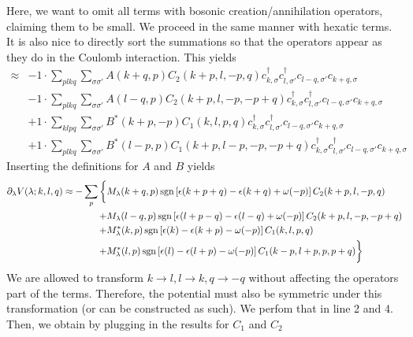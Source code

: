 Here, we want to omit all terms with bosonic creation/annihilation operators, claiming them to be small. We proceed in the same manner with hexatic terms.
It is also nice to directly sort the summations so that the operators appear as they do in the Coulomb interaction. This yields
\begin{align*}
	[\eta, H'] \approx 	&-1 \cdot \sum_{ p l k q } \sum_{ \sigma \sigma' } A( k+q, p )  C_2( k+p, l, -p, q )   c_{ k, \sigma }^\dagger  c_{ l, \sigma' }^\dagger  c_{ l-q, \sigma' } c_{ k+q, \sigma }  \\
	&-1 \cdot \sum_{ p l k q } \sum_{ \sigma \sigma' } A( l-q, p )  C_2( k+p, l, -p, -p+q )   c_{ k, \sigma }^\dagger  c_{ l, \sigma' }^\dagger  c_{ l-q, \sigma' } c_{ k+q, \sigma }  \\
	&+1 \cdot \sum_{ k l p q } \sum_{ \sigma \sigma' } B^*( k+p, -p )  C_1( k, l, p, q )   c_{ k, \sigma }^\dagger  c_{ l, \sigma' }^\dagger  c_{ l-q, \sigma' } c_{ k+q, \sigma }  \\
	&+1 \cdot \sum_{ p l k q } \sum_{ \sigma \sigma' } B^*( l-p, p )  C_1( k+p, l-p, -p, -p+q )   c_{ k, \sigma }^\dagger  c_{ l, \sigma' }^\dagger  c_{ l-q, \sigma' } c_{ k+q, \sigma } 
\end{align*}
Inserting the definitions for $A$ and $B$ yields
\begin{align*}
	\partial_{\lambda} V(\lambda; k, l, q) \approx - \sum_{p} \bigg\{ &M_{\lambda}( k+q, p )  \operatorname{sgn} \left[ \epsilon( k+p+q )  - \epsilon( k+q ) +\omega( -p )  \right]C_2( k+p, l, -p, q ) \\
	+ &M_{\lambda}( l-q, p )  \operatorname{sgn} \left[ \epsilon( l+p-q )  - \epsilon( l-q ) +\omega( -p )  \right]C_2( k+p, l, -p, -p+q ) \\
	+ &M_{\lambda}^*( k, p )  \operatorname{sgn} \left[ \epsilon( k )  - \epsilon( k+p ) -\omega( -p )  \right]C_1( k, l, p, q ) \\
	+ &M_{\lambda}^*( l, p )  \operatorname{sgn} \left[ \epsilon( l )  - \epsilon( l+p ) -\omega( -p )  \right]C_1( k-p, l+p, p, p+q )  \bigg\}
\end{align*}
We are allowed to transform $k \to l, l \to k, q \to -q$ without affecting the operators part of the terms. Therefore, the potential must also be symmetric under this transformation (or can be constructed as such). We perfom that in line 2 and 4. Then, we obtain by plugging in the results for $C_1$ and $C_2$
